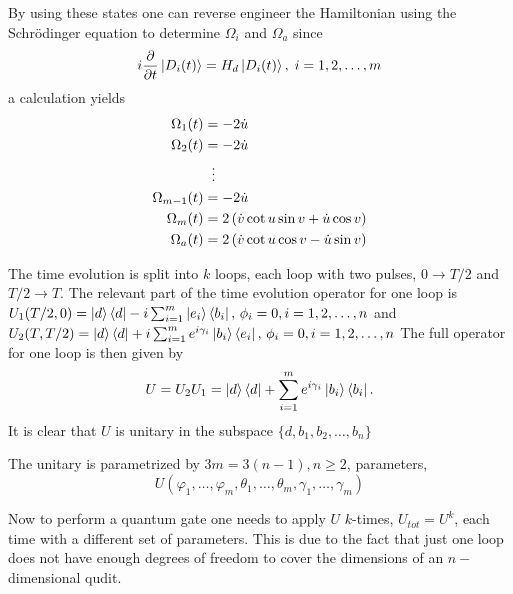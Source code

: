By using these states one can reverse engineer the Hamiltonian using the Schrödinger equation to determine $\Omega_i$ and $\Omega_a$ since 
\begin{equation}
i\pdv{}{t}\ket{D_i(t)} = H_d\ket{D_i(t)},\; i = 1,2,\dots,m
\end{equation}
a calculation  yields
\begin{equation}
\begin{aligned}
\Omega_1(t) &= -2\dot{u}
\\ 
\Omega_2(t) &= -2\dot{u}
\\
&\hspace{2mm}\vdots
\\
\Omega_{m-1}(t) &= -2\dot{u}
\\
\Omega_m(t) &= 2\left(\dot{v}\cot u\sin v + \dot{u}\cos v \right)
\\
\Omega_a(t) &= 2\left(\dot{v}\cot u\cos v - \dot{u}\sin v \right)
\end{aligned}
\end{equation}

The time evolution is split into $k$ loops, each loop with two pulses, $0 \longrightarrow T/2$ and $T/2 \longrightarrow T$. The relevant part of the time evolution operator for one loop is  
$U_1(T/2,0) = \ket{d}\bra{d} -i\sum_{i = 1}^m \ket{e_i}\bra{b_i},\, \phi_i = 0, i = 1,2,\dots,n$ and $U_2(T,T/2) = \ket{d}\bra{d} + i\sum_{i = 1}^m e^{i\gamma_i}\ket{b_i}\bra{e_i},\, \phi_i = 0, i = 1,2,\dots,n $
The full operator for one loop is then given by 
\begin{equation}
U = U_2U_1 = \ket{d}\bra{d} + \sum_{i = 1}^{m}e^{i\gamma_i}\ket{b_i}\bra{b_i}.
\end{equation}
It is clear that $U$ is unitary in the subspace $\{d,b_1,b_2,\dots,b_n\}$

The unitary is parametrized by $3m = 3(n-1), n\geq 2$, parameters,
\begin{equation}
U(\varphi_1,\dots,\varphi_m,\theta_1,\dots,\theta_m,\gamma_1,\dots,\gamma_m) 
\end{equation} 


Now to perform a quantum gate one needs to apply $U$ $k$-times, $U_{tot} = U^k$, each time with a different set of parameters. This is due to the fact that just one loop does not have enough degrees of freedom to cover the dimensions of an $n-$dimensional qudit.

